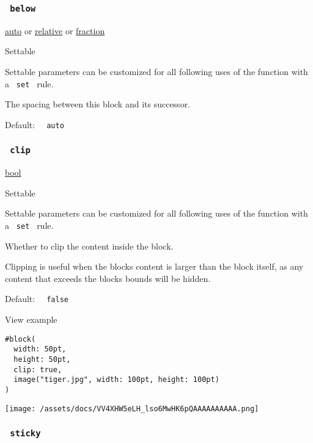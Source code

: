 \subsubsection{\texorpdfstring{\texttt{\ below\ }}{ below }}\label{parameters-below}

\href{/docs/reference/foundations/auto/}{auto} {or}
\href{/docs/reference/layout/relative/}{relative} {or}
\href{/docs/reference/layout/fraction/}{fraction}

{{ Settable }}

\label{parameters-below-settable-tooltip}
Settable parameters can be customized for all following uses of the
function with a \texttt{\ set\ } rule.

The spacing between this block and its successor.

Default: \texttt{\ }{\texttt{\ auto\ }}\texttt{\ }

\subsubsection{\texorpdfstring{\texttt{\ clip\ }}{ clip }}\label{parameters-clip}

\href{/docs/reference/foundations/bool/}{bool}

{{ Settable }}

\label{parameters-clip-settable-tooltip}
Settable parameters can be customized for all following uses of the
function with a \texttt{\ set\ } rule.

Whether to clip the content inside the block.

Clipping is useful when the block\textquotesingle s content is larger
than the block itself, as any content that exceeds the
block\textquotesingle s bounds will be hidden.

Default: \texttt{\ }{\texttt{\ false\ }}\texttt{\ }


View example

\begin{verbatim}
#block(
  width: 50pt,
  height: 50pt,
  clip: true,
  image("tiger.jpg", width: 100pt, height: 100pt)
)
\end{verbatim}

\texttt{[image: /assets/docs/VV4XHW5eLH\_lso6MwHK6pQAAAAAAAAAA.png]}

\subsubsection{\texorpdfstring{\texttt{\ sticky\ }}{ sticky }}\label{parameters-sticky}

